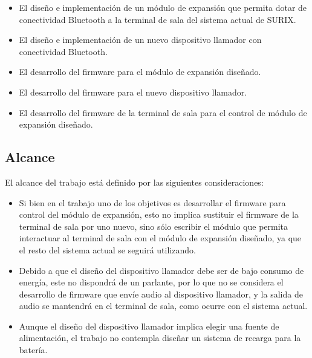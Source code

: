 \begin{itemize}

\item El diseño e implementación de un módulo de expansión que permita dotar de conectividad Bluetooth a la terminal de sala del sistema actual de SURIX.

\item El diseño e implementación de un nuevo dispositivo llamador con conectividad Bluetooth.

\item El desarrollo del firmware para el módulo de expansión diseñado.

\item El desarrollo del firmware para el nuevo dispositivo llamador.

\item El desarrollo del firmware de la terminal de sala para el control de módulo de expansión diseñado.

\end{itemize}

\subsection{Alcance}

El alcance del trabajo está definido por las siguientes consideraciones:

\begin{itemize}
\item Si bien en el trabajo uno de los objetivos es desarrollar el firmware para control del módulo de expansión, esto no implica sustituir el firmware de la terminal de sala por uno nuevo, sino sólo escribir el módulo que permita interactuar al terminal de sala con el módulo de expansión diseñado, ya que el resto del sistema actual se seguirá utilizando.	

\item Debido a que el diseño del dispositivo llamador debe ser de bajo consumo de energía, este no dispondrá de un parlante, por lo que no se considera el desarrollo de firmware que envíe audio al dispositivo llamador, y la salida de audio se mantendrá en el terminal de sala, como ocurre con el sistema actual.

\item Aunque el diseño del dispositivo llamador implica elegir una fuente de alimentación, el trabajo no contempla diseñar un sistema de recarga para la batería.

\end{itemize}

